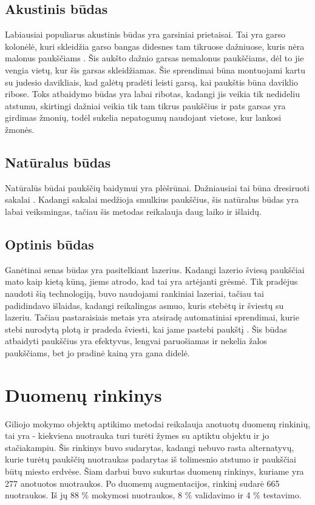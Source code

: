 \documentclass{VUMIFPSkursinis}
\begin{document}
\subsection{Akustinis būdas}
Labiausiai populiarus akustinis būdas yra garsiniai prietaisai. Tai yra garso kolonėlė, kuri skleidžia garso bangas didesnes tam tikruose dažniuose, kuris nėra malonus paukščiams \cite{beason2004can}. Šis aukšto dažnio garsas nemalonus paukščiams, dėl to jie vengia vietų, kur šis garsas skleidžiamas. Šie sprendimai būna montuojami kartu su judesio davikliais, kad galėtų pradėti leisti garsą, kai paukštis būna daviklio ribose. Toks atbaidymo būdas yra labai ribotas, kadangi jis veikia tik nedideliu atstumu, skirtingi dažniai veikia tik tam tikrus paukščius ir pats garsas yra girdimas žmonių, todėl sukelia nepatogumų naudojant vietose, kur lankosi žmonės.

\subsection{Natūralus būdas}
Natūralūs būdai paukščių baidymui yra plėšrūnai. Dažniausiai tai būna dresiruoti sakalai \cite{steensma2016bird}. Kadangi sakalai medžioja smulkius paukščius, šis natūralus būdas yra labai veiksmingas, tačiau šis metodas reikalauja daug laiko ir išlaidų.

\subsection{Optinis būdas}
Ganėtinai senas būdas yra pasitelkiant lazerius. Kadangi lazerio šviesą paukščiai mato kaip kietą kūną, jiems atrodo, kad tai yra artėjanti grėsmė. Tik pradėjus naudoti šią technologiją, buvo naudojami rankiniai lazeriai, tačiau tai padidindavo išlaidas, kadangi reikalingas asmuo, kuris stebėtų ir šviestų su lazeriu. Tačiau pastaraisiais metais yra atsiradę automatiniai sprendimai, kurie stebi nurodytą plotą ir pradeda šviesti, kai jame pastebi paukštį \cite{szentpeteri2018bird}.  Šis būdas atbaidyti paukščius yra efektyvus, lengvai paruošiamas ir nekelia žalos paukščiams, bet jo pradinė kainą yra gana didelė.



\section{Duomenų rinkinys}
Giliojo mokymo objektų aptikimo metodai reikalauja anotuotų duomenų rinkinių, tai yra - kiekviena nuotrauka turi turėti žymes su aptiktu objektu ir jo stačiakampiu. Šis rinkinys buvo sudarytas, kadangi nebuvo rasta alternatyvų, kurie turėtų paukščių nuotraukas padarytas iš tolimesnio atstumo ir paukščiai būtų miesto erdvėse. Šiam darbui buvo sukurtas duomenų rinkinys, kuriame yra 277 anotuotos nuotraukos. Po duomenų augmentacijos, rinkinį sudarė 665 nuotraukos. Iš jų 88 \% mokymosi nuotraukos, 8 \% validavimo ir 4 \% testavimo.
\end{document}
